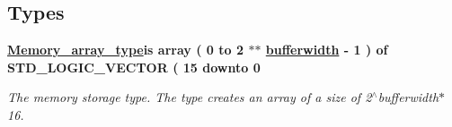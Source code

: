 \subsection*{Types}
 \begin{DoxyCompactItemize}
\item 
\hypertarget{classADC__buffer_1_1Buffer__ADC_a658e2166090ca64ce974029de2840027}{{\bfseries \hyperlink{classADC__buffer_1_1Buffer__ADC_a658e2166090ca64ce974029de2840027}{Memory\-\_\-array\-\_\-type}{\bfseries \textcolor{vhdlkeyword}{is}\textcolor{vhdlchar}{ }\textcolor{vhdlchar}{ }\textcolor{vhdlkeyword}{array}\textcolor{vhdlchar}{ }\textcolor{vhdlchar}{(}\textcolor{vhdlchar}{ } \textcolor{vhdldigit}{0} \textcolor{vhdlchar}{ }\textcolor{vhdlchar}{ }\textcolor{vhdlchar}{ }\textcolor{vhdlkeyword}{to}\textcolor{vhdlchar}{ }\textcolor{vhdlchar}{ }\textcolor{vhdlchar}{ } \textcolor{vhdldigit}{2} \textcolor{vhdlchar}{ }\textcolor{vhdlchar}{$\ast$}\textcolor{vhdlchar}{$\ast$}\textcolor{vhdlchar}{ }{\bfseries \hyperlink{classADC__buffer_a2f94b7b31a8914ee23be5e000f89e921}{bufferwidth}} \textcolor{vhdlchar}{ }\textcolor{vhdlchar}{-\/}\textcolor{vhdlchar}{ } \textcolor{vhdldigit}{1} \textcolor{vhdlchar}{ }\textcolor{vhdlchar}{)}\textcolor{vhdlchar}{ }\textcolor{vhdlchar}{ }\textcolor{vhdlkeyword}{of}\textcolor{vhdlchar}{ }\textcolor{comment}{S\-T\-D\-\_\-\-L\-O\-G\-I\-C\-\_\-\-V\-E\-C\-T\-O\-R}\textcolor{vhdlchar}{ }\textcolor{vhdlchar}{(}\textcolor{vhdlchar}{ }\textcolor{vhdlchar}{ } \textcolor{vhdldigit}{15} \textcolor{vhdlchar}{ }\textcolor{vhdlchar}{ }\textcolor{vhdlchar}{ }\textcolor{vhdlkeyword}{downto}\textcolor{vhdlchar}{ }\textcolor{vhdlchar}{ }\textcolor{vhdlchar}{ } \textcolor{vhdldigit}{0} \textcolor{vhdlchar}{ }}} }\label{classADC__buffer_1_1Buffer__ADC_a658e2166090ca64ce974029de2840027}

\begin{DoxyCompactList}\small\item\em The memory storage type. The type creates an array of a size of 2$^\wedge$bufferwidth$\ast$16. \end{DoxyCompactList}\end{DoxyCompactItemize}
